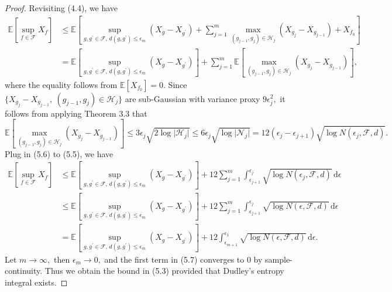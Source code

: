 \documentclass{article}
\newcommand{\E}{\mathbb{E}}
\begin{document}
\begin{proof}
Revisiting (4.4), we have
\begin{align*}
	\E\left[\sup_{f\in\mathcal{F}}X_f\right] &\leq \E\left[\sup_{g,g^\prime\in\mathcal{F},\,d(g,g^\prime)\leq\epsilon_m}(X_g - X_{g^\prime}) + \sum_{j=1}^m\max_{(g_{j-1},g_j)\in\mathcal{H}_j}\left(X_{g_j} - X_{g_{j-1}}\right) + X_{f_0}\right]\\
	&= \E\left[\sup_{g,g^\prime\in\mathcal{F},\,d(g,g^\prime)\leq\epsilon_m}(X_g - X_{g^\prime})\right] + \sum_{j=1}^m\E\left[\max_{(g_{j-1},g_j)\in\mathcal{H}_j}\left(X_{g_j} - X_{g_{j-1}}\right)\right],\tag{5.5}
\end{align*}
where the equality follows from $\E[X_{f_0}]=0.$ Since $\{X_{g_j} - X_{g_{j-1}},\ (g_{j-1},g_j)\in\mathcal{H}_j\}$ are sub-Gaussian with variance proxy $9\epsilon_{j}^2,$ it follows from applying Theorem 3.3 that
\begin{equation*}
	\E\left[\max_{(g_{j-1},g_j)\in\mathcal{H}_j}(X_{g_j}-X_{g_{j-1}})\right] \leq 3\epsilon_{j}\sqrt{2\log\vert\mathcal{H}_j\vert} \leq 6\epsilon_{j}\sqrt{\log\vert\mathcal{N}_j\vert} = 12(\epsilon_j - \epsilon_{j+1})\sqrt{\log N(\epsilon_{j},\mathcal{F},d)}.\tag{5.6}
\end{equation*}
Plug in (5.6) to (5.5), we have
\begin{align*}
	\E\left[\sup_{f\in\mathcal{F}}X_f\right] &\leq   \E\left[\sup_{g,g^\prime\in\mathcal{F},\,d(g,g^\prime)\leq\epsilon_m}(X_g - X_{g^\prime})\right] + 12\sum_{j=1}^m\int_{\epsilon_{j+1}}^{\epsilon_{j}}\sqrt{\log N(\epsilon_j,\mathcal{F},d)}\,\mathrm{d}\epsilon\\
	&\leq \E\left[\sup_{g,g^\prime\in\mathcal{F},\,d(g,g^\prime)\leq\epsilon_m}(X_g - X_{g^\prime})\right] + 12\sum_{j=1}^m\int_{\epsilon_{j+1}}^{\epsilon_{j}}\sqrt{\log N(\epsilon,\mathcal{F},d)}\,\mathrm{d}\epsilon\\
	&= \E\left[\sup_{g,g^\prime\in\mathcal{F},\,d(g,g^\prime)\leq\epsilon_m}(X_g - X_{g^\prime})\right] + 12\int_{\epsilon_{m+1}}^{\epsilon_1}\sqrt{\log N(\epsilon,\mathcal{F},d)}\,\mathrm{d}\epsilon.\tag{5.7}
\end{align*}
Let $m\to\infty,$ then $\epsilon_m\to 0,$ and the first term in (5.7) converges to $0$ by sample-continuity. Thus we obtain the bound in (5.3) provided that Dudley's entropy integral exists.
\end{proof}
\end{document}
